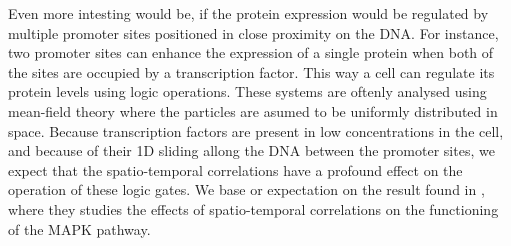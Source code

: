 Even more intesting would be, if the protein expression would be regulated by multiple promoter sites positioned in close proximity on the DNA. For instance, two promoter sites can enhance the expression of a single protein when both of the sites are occupied by a transcription factor. This way a cell can regulate its protein levels using logic operations. These systems are oftenly analysed using mean-field theory where the particles are asumed to be uniformly distributed in space. Because transcription factors are present in low concentrations in the cell, and because of their 1D sliding allong the DNA between the promoter sites, we expect that the spatio-temporal correlations have a profound effect on the operation of these logic gates. We base or expectation on the result found in \cite{Takahashi2010}, where they studies the effects of spatio-temporal correlations on the functioning of the MAPK pathway.